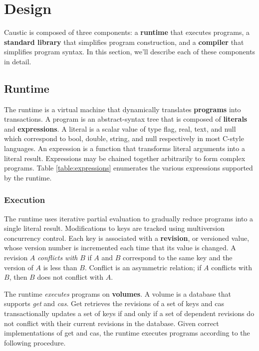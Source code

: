 \documentclass[../main.tex]{subfiles}
\begin{document}
\section{Design}
Caustic is composed of three components: a \textbf{runtime} that executes programs, a
\textbf{standard library} that simplifies program construction, and a \textbf{compiler} that
simplifies program syntax. In this section, we'll describe each of these components in detail.

  \subsection{Runtime}
  The runtime is a virtual machine that dynamically translates \textbf{programs} into transactions.
  A program is an abstract-syntax tree that is composed of \textbf{literals} and
  \textbf{expressions}. A literal is a scalar value of type flag, real, text, and null which
  correspond to bool, double, string, and null respectively in most C-style languages. An expression
  is a function that transforms literal arguments into a literal result. Expressions may be chained
  together arbitrarily to form complex programs. Table \ref{table:expressions} enumerates the
  various expressions supported by the runtime.

    \subsubsection{Execution}
    The runtime uses iterative partial evaluation to gradually reduce programs into a single literal
    result. Modifications to keys are tracked using multiversion concurrency control. Each key is
    associated with a \textbf{revision}, or versioned value, whose version number is incremented
    each time that its value is changed. A revision $A$ \emph{conflicts with} $B$ if $A$ and $B$
    correspond to the same key and the version of $A$ is less than $B$. Conflict is an asymmetric
    relation; if $A$ conflicts with $B$, then $B$ does not conflict with $A$.

    The runtime \emph{executes} programs on \textbf{volumes}. A volume is a database that supports
    \emph{get} and \emph{cas}. Get retrieves the revisions of a set of keys and cas transactionally
    updates a set of keys if and only if a set of dependent revisions do not conflict with their
    current revisions in the database. Given correct implementations of get and cas, the runtime
    executes programs according to the following procedure.
\end{document}
